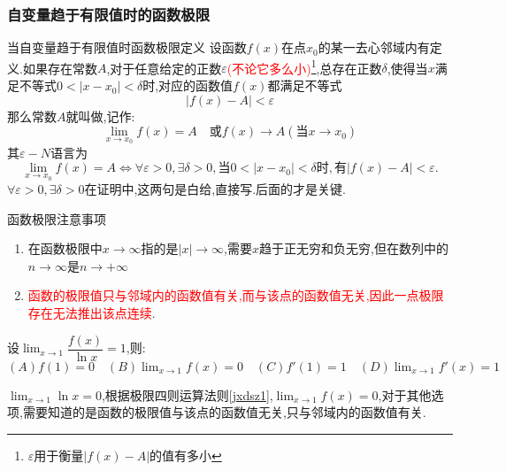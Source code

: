 \documentclass[8pt a4paper, oneside, UTF8]{ctexbook}
\begin{document}
\begin{sloppypar}
    \subsubsection{自变量趋于有限值时的函数极限}
    \begin{defn}{当自变量趋于有限值时函数极限定义}{}
        设函数$f(x)$在点$x_0$的某一去心邻域内有定义.如果存在常数$A$,对于任意给定的正数$\varepsilon$\textcolor{red}{(不论它多么小)\footnote{$\varepsilon$用于衡量$|f(x)-A|$的值有多小}},总存在正数$\delta$,使得当$x$满足不等式$0<|x-x_0|<\delta$时,对应的函数值$f(x)$都满足不等式
        $$
            |f(x)-A|<\varepsilon
        $$
        那么常数$A$就叫做,记作:
        $$
            \lim_{x\to x_0}f(x)=A\quad\text{或}f(x)\to A(\text{当}x\to x_0)
        $$
        其$\varepsilon-N$语言为
        $$
            \lim_{x\to x_0}f(x)=A\Leftrightarrow\forall\varepsilon>0,\exists\delta>0,\text{当}0<|x-x_0|<\delta\text{时},\text{有}|f(x)-A|<\varepsilon.
        $$
        $\forall\varepsilon>0,\exists\delta>0$在证明中,这两句是白给,直接写.后面的才是关键.
    \end{defn}
    \begin{criterion}{函数极限注意事项}{}
        \begin{enumerate}
            \item 在函数极限中$x \to \infty$指的是$|x| \to \infty$,需要$x$趋于正无穷和负无穷,但在数列中的$n \to \infty$是$n \to +\infty$
            \item \textcolor{red}{函数的极限值只与邻域内的函数值有关,而与该点的函数值无关,因此一点极限存在无法推出该点连续}.
        \end{enumerate}
    \end{criterion}
    \begin{problem}
    设$\lim_{x \to 1}\dfrac{f(x)}{\ln x}=1$,则:\\
    $(A) f(1)=0 \quad (B)\lim_{x\to 1}f(x)=0 \quad (C)f'(1)=1 \quad (D)\lim_{x \to 1}f'(x)=1$
    \end{problem}
    \begin{solution}
        $\lim_{x\to 1}\ln x=0$,根据极限四则运算法则\ref{jxdsz1},$\lim_{x \to 1} f(x)=0$,对于其他选项,需要知道的是函数的极限值与该点的函数值无关,只与邻域内的函数值有关.
    \end{solution}

\end{sloppypar}
\end{document}
